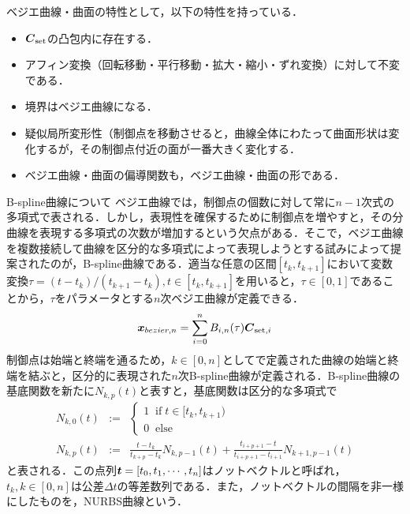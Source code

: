 		ベジエ曲線・曲面の特性として，以下の特性を持っている．
		\begin{itemize}
			\item $ \boldsymbol{C}_{\mathrm{set}} $の凸包内に存在する．
			\item アフィン変換（回転移動・平行移動・拡大・縮小・ずれ変換）に対して不変である．
			\item 境界はベジエ曲線になる．
			\item 疑似局所変形性（制御点を移動させると，曲線全体にわたって曲面形状は変化するが，その制御点付近の面が一番大きく変化する．
			\item ベジエ曲線・曲面の偏導関数も，ベジエ曲線・曲面の形である．
		\end{itemize}
		
		B-spline曲線について
		ベジエ曲線では，制御点の個数に対して常に$ n-1 $次式の多項式で表される．しかし，表現性を確保するために制御点を増やすと，その分曲線を表現する多項式の次数が増加するという欠点がある．そこで，ベジエ曲線を複数接続して曲線を区分的な多項式によって表現しようとする試みによって提案されたのが，B-spline曲線である．適当な任意の区間$[t_k,t_{k+1}] $において変数変換$ \tau = (t-t_k)/(t_{k+1}-t_k), t\in[t_k,t_{k+1}] $を用いると，$ \tau \in [0,1] $であることから，$ \tau $をパラメータとする$ n $次ベジエ曲線が定義できる．
		\begin{equation}\label{eq:Segmented_Bezier}
			\boldsymbol{x}_{bezier,n} = \sum_{i=0}^{n} B_{i,n}(\tau)\boldsymbol{C}_{\mathrm{set},i}
		\end{equation}
		制御点は始端と終端を通るため，$ k\in[0,n] $としてで定義された曲線の始端と終端を結ぶと，区分的に表現された$ n $次B-spline曲線が定義される．B-spline曲線の基底関数を新たに$ N_{k,p}(t) $と表すと，基底関数は区分的な多項式で
		\begin{eqnarray}\label{eq:de_door_cox}
			N_{k,0}(t) &:=& \begin{cases} 
			1 \;\; \mathrm{if}\; t\in[t_k,t_{k+1}) \\
			0 \;\; \mathrm{else}
		\end{cases} \\
		N_{k,p}(t) &:=& \frac{t-t_k}{t_{k+p} - t_k} N_{k,p-1}(t) + \frac{t_{i+p+1}-t}{t_{i+p+1}-t_{i+1}} N_{k+1,p-1}(t)
		\end{eqnarray}
		と表される．この点列$ \boldsymbol{t} = [t_0,t_1,\cdots, t_n] $はノットベクトルと呼ばれ，$ t_k, k \in [0,n] $は公差$ \Delta t $の等差数列である．また，ノットベクトルの間隔を非一様にしたものを，NURBS曲線という．
		
